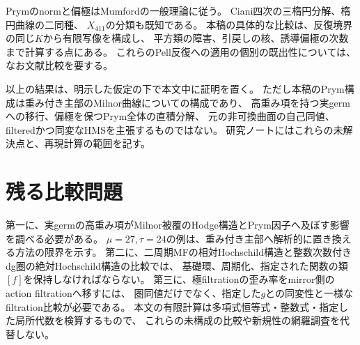 \documentclass[11pt,a4paper]{ltjsarticle}
\begin{document}
Prymのnormと偏極はMumford\cite{BoundaryMumford}の一般理論に従う。
Ciani四次の三楕円分解、楕円曲線の二同種、
$X_{411}$の分類\cite{BoundaryMirandaPersson}も既知である。
本稿の具体的な比較は、反復境界の同じ$K$から有限写像を構成し、
平方類の障害、引戻しの核、誘導偏極の次数まで計算する点にある。
これらのPell反復への適用の個別の既出性については、なお文献比較を要する。

以上の結果は、明示した仮定の下で本文中に証明を置く。
ただし本稿のPrym構成は重み付き主部のMilnor曲線についての構成であり、
高重み項を持つ実germへの移行、偏極を保つPrym全体の直積分解、
元の非可換曲面の自己同値、filteredかつ同変なHMSを主張するものではない。
研究ノートにはこれらの未解決点と、再現計算の範囲を記す。









\section{残る比較問題}
第一に、実germの高重み項がMilnor被覆のHodge構造とPrym因子へ及ぼす影響を調べる必要がある。
$\mu=27,\tau=24$の例は、重み付き主部へ解析的に置き換える方法の限界を示す。
第二に、二周期MFの相対Hochschild構造と整数次数付きdg圏の絶対Hochschild構造の比較では、
基礎環、周期化、指定された関数の類$[f]$を保持しなければならない。
第三に、極filtrationの歪み率をmirror側のaction filtrationへ移すには、
圏同値だけでなく、指定した$g$との同変性と一様なfiltration比較が必要である。
本文の有限計算は多項式恒等式・整数式・指定した局所代数を検算するもので、
これらの未構成の比較や新規性の網羅調査を代替しない。


\end{document}
